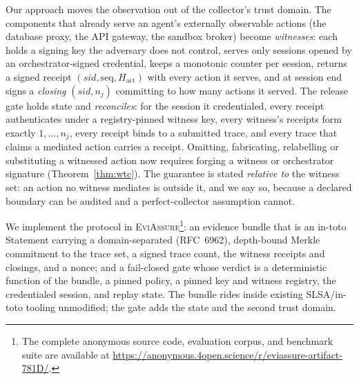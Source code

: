 \documentclass[letterpaper,10pt,twocolumn]{article}
\theoremstyle{definition}
\begin{document}
Our approach moves the observation out of the collector's trust domain. The components that already serve an agent's externally observable actions  (the database proxy, the API gateway, the sandbox broker)  become \emph{witnesses}: each holds a signing key the adversary does not control, serves only sessions opened by an orchestrator-signed credential, keeps a monotonic counter per session, returns a signed receipt $(\mathit{sid}, \mathrm{seq}, H_{\mathrm{act}})$ with every action it serves, and at session end signs a \emph{closing} $(\mathit{sid}, n_j)$ committing to how many actions it served. The release gate holds state and \emph{reconciles}: for the session it credentialed, every receipt authenticates under a registry-pinned witness key, every witness's receipts form exactly $1,\dots,n_j$, every receipt binds to a submitted trace, and every trace that claims a mediated action carries a receipt. Omitting, fabricating, relabelling or substituting a witnessed action now requires forging a witness or orchestrator signature (Theorem~\ref{thm:wtc}). The guarantee is stated \emph{relative to} the witness set: an action no witness mediates is outside it, and we say so, because a declared boundary can be audited and a perfect-collector assumption cannot.

We implement the protocol in \textsc{EviAssure}\footnote{The complete anonymous source code, evaluation corpus, and benchmark suite are available at \url{https://anonymous.4open.science/r/eviassure-artifact-781D/}.}: an evidence bundle that is an in-toto Statement carrying a domain-separated (RFC~6962), depth-bound Merkle commitment to the trace set, a signed trace count, the witness receipts and closings, and a nonce; and a fail-closed gate whose verdict is a deterministic function of the bundle, a pinned policy, a pinned key and witness registry, the credentialed session, and replay state. The bundle rides inside existing SLSA/in-toto tooling unmodified; the gate adds the state and the second trust domain.
\end{document}
